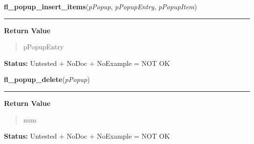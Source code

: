     \label{xformslib:library:fl_popup_insert_items}

    \vspace{0.5ex}

\hspace{.8\funcindent}\begin{boxedminipage}{\funcwidth}

    \raggedright \textbf{fl\_popup\_insert\_items}(\textit{pPopup}, \textit{pPopupEntry}, \textit{pPopupItem})

    \vspace{-1.5ex}

    \rule{\textwidth}{0.5\fboxrule}
\setlength{\parskip}{2ex}
\setlength{\parskip}{1ex}
      \textbf{Return Value}
    \vspace{-1ex}

      \begin{quote}
      pPopupEntry

      \end{quote}

\textbf{Status:} Untested + NoDoc + NoExample = NOT OK



    \end{boxedminipage}

    \label{xformslib:library:fl_popup_delete}

    \vspace{0.5ex}

\hspace{.8\funcindent}\begin{boxedminipage}{\funcwidth}

    \raggedright \textbf{fl\_popup\_delete}(\textit{pPopup})

    \vspace{-1.5ex}

    \rule{\textwidth}{0.5\fboxrule}
\setlength{\parskip}{2ex}
\setlength{\parskip}{1ex}
      \textbf{Return Value}
    \vspace{-1ex}

      \begin{quote}
      num

      \end{quote}

\textbf{Status:} Untested + NoDoc + NoExample = NOT OK



    \end{boxedminipage}

